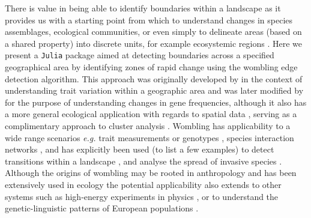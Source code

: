 There is value in being able to identify boundaries within a landscape
as it provides us with a starting point from which to understand changes
in species assemblages, ecological communities, or even simply to
delineate areas (based on a shared property) into discrete units, for
example ecosystemic regions \cite{Post2007ProBou, Fortin2000IssRel}.
Here we present a \texttt{Julia} \cite{Bezanson2017JulFre} package aimed
at detecting boundaries across a specified geographical area by
identifying zones of rapid change using the wombling edge detection
algorithm. This approach was originally developed by \cite{Womble1951DifSys}
in the context of understanding trait variation within a geographic area
and was later modified by \cite{Barbujani1989DetReg} for the purpose of
understanding changes in gene frequencies, although it also has a more
general ecological application with regards to spatial data
\cite{Fortin2005SpaAna}, serving as a complimentary approach to cluster
analysis \cite{Fortin1995DelEco}. Wombling has applicability to a wide
range scenarios \emph{e.g.} trait measurements or genotypes
\cite{Barbujani1989DetReg}, species interaction networks
\cite{Fortin2021NetEco}, and has explicitly been used (to list a few
examples) to detect transitions within a landscape
\cite{Philibert2008SpaStr, Camarero2000BouDet}, and analyse the spread
of invasive species \cite{Fitzpatrick2010EcoBou}. Although the origins
of wombling may be rooted in anthropology and has been extensively used
in ecology the potential applicability also extends to other systems
such as high-energy experiments in physics \cite{Matchev2020FinWom}, or
to understand the genetic-linguistic patterns of European populations
\cite{Sokal1990GenLan}.

